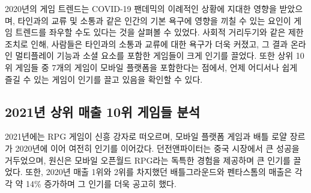 \documentclass[a4paper, 11pt]{article}
\begin{document}
2020년의 게임 트렌드는 COVID-19 팬데믹의 이례적인 상황에 지대한 영향을 받았으며, 타인과의 교류 및 소통과 같은 인간의 기본 욕구에 영향을 끼칠 수 있는 요인이 게임 트렌드를 좌우할 수도 있다는 것을 살펴볼 수 있었다. 사회적 거리두기와 같은 제한 조치로 인해, 사람들은 타인과의 소통과 교류에 대한 욕구가 더욱 커졌고, 그 결과 온라인 멀티플레이 기능과 소셜 요소를 포함한 게임들이 크게 인기를 끌었다. 또한 상위 10위 게임들 중 7개의 게임이 모바일 플랫폼을 포함한다는 점에서, 언제 어디서나 쉽게 즐길 수 있는 게임이 인기를 끌고 있음을 확인할 수 있다.

\subsection{2021년 상위 매출 10위 게임들 분석}
2021년에는 RPG 게임이 신흥 강자로 떠오르며, 모바일 플랫폼 게임과 배틀 로얄 장르가 2020년에 이어 여전히 인기를 이어갔다. 던전앤파이터는 중국 시장에서 큰 성공을 거두었으며, 원신은 모바일 오픈월드 RPG라는 독특한 경험을 제공하며 큰 인기를 끌었다. 또한, 2020년 매출 1위와 2위를 차지했던 배틀그라운드와 펜타스톰의 매출은 각각 약 14\% 증가하며 그 인기를 더욱 공고히 했다.

\begin{table}[h!]
    \caption{2021년 상위 매출 10위 게임 \cite{2021top10}}
\end{table}
\end{document}
